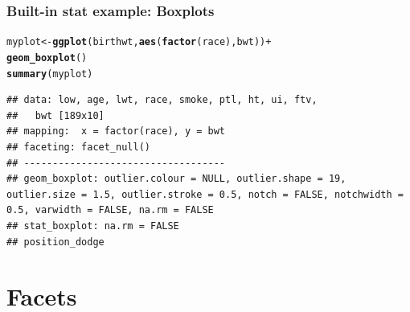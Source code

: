 \documentclass{beamer}\usepackage[]{graphicx}\usepackage[]{color}
\makeatletter
\newcommand{\hlopt}[1]{\textcolor[rgb]{0,0,0}{#1}}%
\newcommand{\hlstd}[1]{\textcolor[rgb]{0.345,0.345,0.345}{#1}}%
\newcommand{\hlkwb}[1]{\textcolor[rgb]{0.69,0.353,0.396}{#1}}%
\newcommand{\hlkwd}[1]{\textcolor[rgb]{0.737,0.353,0.396}{\textbf{#1}}}%
\newenvironment{kframe}{%
 \def\at@end@of@kframe{}%
 \ifinner\ifhmode%
  \def\at@end@of@kframe{\end{minipage}}%
  \begin{minipage}{\columnwidth}%
 \fi\fi%
 \def\FrameCommand##1{\hskip\@totalleftmargin \hskip-\fboxsep
 \colorbox{shadecolor}{##1}\hskip-\fboxsep
     \hskip-\linewidth \hskip-\@totalleftmargin \hskip\columnwidth}%
 \MakeFramed {\advance\hsize-\width
   \@totalleftmargin\z@ \linewidth\hsize
   \@setminipage}}%
 {\par\unskip\endMakeFramed%
 \at@end@of@kframe}
\newenvironment{knitrout}{}{} %
\makeatother
\begin{document}

\begin{frame}[fragile]
\frametitle{Built-in stat example: Boxplots}
\begin{knitrout}\footnotesize
{}\color{fgcolor}\begin{kframe}
\begin{alltt}
\hlstd{myplot} \hlkwb{<-} \hlkwd{ggplot}\hlstd{(birthwt,} \hlkwd{aes}\hlstd{(}\hlkwd{factor}\hlstd{(race), bwt))} \hlopt{+}
        \hlkwd{geom_boxplot}\hlstd{()}
\hlkwd{summary}\hlstd{(myplot)}
\end{alltt}
\begin{verbatim}
## data: low, age, lwt, race, smoke, ptl, ht, ui, ftv,
##   bwt [189x10]
## mapping:  x = factor(race), y = bwt
## faceting: facet_null() 
## -----------------------------------
## geom_boxplot: outlier.colour = NULL, outlier.shape = 19, outlier.size = 1.5, outlier.stroke = 0.5, notch = FALSE, notchwidth = 0.5, varwidth = FALSE, na.rm = FALSE
## stat_boxplot: na.rm = FALSE
## position_dodge
\end{verbatim}
\end{kframe}
\end{knitrout}
\end{frame}


\section*{Facets}
\frame{\sectionpage}

\end{document}
